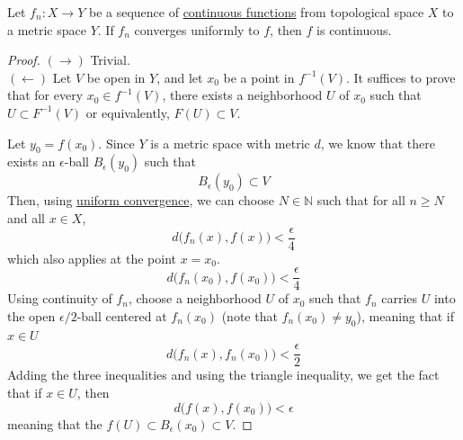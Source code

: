   \begin{theorem}
    \label{thm:uniform-limit-theorem}
    Let $f_n: X \to Y$ be a sequence of \hyperref[def:continuous_func]{continuous functions} from topological space $X$ to a metric space $Y$. If $f_n$ converges uniformly to $f$, then $f$ is continuous. 
  \end{theorem}
  \begin{proof}
    $(\rightarrow)$ Trivial. \\
    $(\leftarrow)$ Let $V$ be open in $Y$, and let $x_0$ be a point in $f^{-1} (V)$. It suffices to prove that for every $x_0 \in f^{-1} (V)$, there exists a neighborhood $U$ of $x_0$ such that $U \subset F^{-1} (V)$ or equivalently, $F(U) \subset V$. 

    Let $y_0 = f(x_0)$. Since $Y$ is a metric space with metric $d$, we know that there exists an $\epsilon$-ball $B_\epsilon (y_0)$ such that
    \begin{equation}
      B_\epsilon (y_0) \subset V
    \end{equation}
    Then, using \hyperref[def:uniform-convergence]{uniform convergence}, we can choose $N \in \mathbb{N}$ such that for all $n \geq N$ and all $x \in X$, 
    \begin{equation}
      d \big( f_n (x), f(x) \big) < \frac{\epsilon}{4}
    \end{equation}
    which also applies at the point $x = x_0$. 
    \begin{equation}
      d \big( f_n (x_0), f(x_0) \big) < \frac{\epsilon}{4}
    \end{equation}
    Using continuity of $f_n$, choose a neighborhood $U$ of $x_0$ such that $f_n$ carries $U$ into the open $\epsilon/2$-ball centered at $f_n (x_0)$ (note that $f_n (x_0) \neq y_0$), meaning that if $x \in U$
    \begin{equation}
      d \big( f_n (x), f_n (x_0) \big) < \frac{\epsilon}{2}
    \end{equation}
    Adding the three inequalities and using the triangle inequality, we get the fact that if $x \in U$, then 
    \begin{equation}
      d \big( f(x), f(x_0) \big) < \epsilon
    \end{equation}
    meaning that the $f(U) \subset B_\epsilon (x_0) \subset V$. 


\end{proof}
